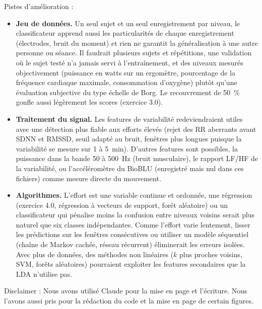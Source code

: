 \documentclass[11pt,letterpaper]{article}
\begin{document}
Pistes d'amélioration :
\begin{itemize}
\item \textbf{Jeu de données.} Un seul sujet et un seul enregistrement par niveau, le classificateur apprend aussi les particularités de chaque enregistrement (électrodes, bruit du moment) et rien ne garantit la généralisation à une autre personne ou séance. Il faudrait plusieurs sujets et répétitions, une validation où le sujet testé n'a jamais servi à l'entraînement, et des niveaux mesurés objectivement (puissance en watts sur un ergomètre, pourcentage de la fréquence cardiaque maximale, consommation d'oxygène) plutôt qu'une évaluation subjective du type échelle de Borg. Le recouvrement de 50~\% gonfle aussi légèrement les scores (exercice 3.0).
\item \textbf{Traitement du signal.} Les features de variabilité redeviendraient utiles avec une détection plus fiable aux efforts élevés (rejet des RR aberrants avant SDNN et RMSSD, seuil adapté au bruit, fenêtres plus longues puisque la variabilité se mesure sur 1 à 5~min). D'autres features sont possibles, la puissance dans la bande 50 à 500~Hz (bruit musculaire), le rapport LF/HF de la variabilité, ou l'accéléromètre du BioBLU (enregistré mais nul dans ces fichiers) comme mesure directe du mouvement.
\item \textbf{Algorithmes.} L'effort est une variable continue et ordonnée, une régression (exercice 4.0, régression à vecteurs de support, forêt aléatoire) ou un classificateur qui pénalise moins la confusion entre niveaux voisins serait plus naturel que six classes indépendantes. Comme l'effort varie lentement, lisser les prédictions sur les fenêtres consécutives ou utiliser un modèle séquentiel (chaîne de Markov cachée, réseau récurrent) éliminerait les erreurs isolées. Avec plus de données, des méthodes non linéaires ($k$ plus proches voisins, SVM, forêts aléatoires) pourraient exploiter les features secondaires que la LDA n'utilise pas.
\end{itemize}

\bigskip
Disclaimer : Nous avons utilisé Claude pour la mise en page et l'écriture. Nous l'avons aussi pris pour la rédaction du code et la mise en page de certain figures.
\end{document}
